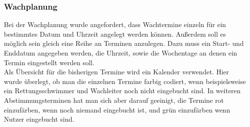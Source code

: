 \documentclass[fontsize=12pt,openright,oneside,paper=a4,BCOR=1cm]{scrbook}
\begin{document}
\subsubsection{Wachplanung}

Bei der Wachplanung wurde angefordert, dass Wachtermine einzeln für ein bestimmtes Datum und Uhrzeit angelegt werden können. Außerdem soll es möglich sein gleich eine Reihe an Terminen anzulegen. Dazu muss ein Start- und Enddatum angegeben werden, die Uhrzeit, sowie die Wochentage an denen ein Termin eingestellt werden soll. \\
Als Übersicht für die bisherigen Termine wird ein Kalender verwendet. Hier wurde überlegt, ob man die einzelnen Termine farbig codiert, wenn beispielsweise ein \glqq Rettungsschwimmer\grqq{} und \glqq Wachleiter\grqq{} noch nicht eingebucht sind. In weiteren Abstimmungsterminen hat man sich aber darauf geeinigt, die Termine rot einzufärben, wenn noch niemand eingebucht ist, und grün einzufärben wenn Nutzer eingebucht sind.
\end{document}
